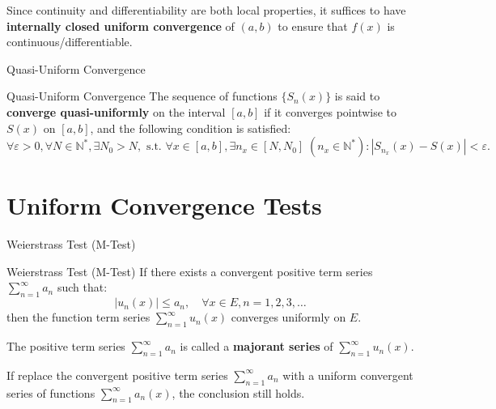 \documentclass[11pt]{../../TexTemplate/elegantbook}
\begin{document}
\begin{note}
    Since continuity and differentiability are both local properties, 
    it suffices to have \textbf{internally closed uniform convergence} of \( (a, b) \) 
    to ensure that \( f(x) \) is continuous/differentiable.
\end{note}


\begin{leftbarTitle}{Quasi-Uniform Convergence}\end{leftbarTitle}
\begin{definition}{Quasi-Uniform Convergence}
    The sequence of functions \( \{ S_n(x) \} \) is said to \textbf{converge quasi-uniformly}
    on the interval \( [a, b] \) 
    if it converges pointwise to \( S(x) \) on \( [a, b] \), and the following condition is satisfied:
    \[
    \forall \varepsilon > 0, \forall N \in \mathbb{N}^*, \exists N_0 > N,
    \text{ s.t. } \forall x \in [a, b], \exists n_x \in [N, N_0] \; 
    (n_x \in \mathbb{N}^*): |S_{n_x}(x) - S(x)| < \varepsilon.
    \]    
\end{definition}


\section{Uniform Convergence Tests}
\begin{leftbarTitle}{Weierstrass Test (M-Test)}\end{leftbarTitle}
\begin{theorem}{Weierstrass Test (M-Test)}
    If there exists a convergent positive term series \( \sum_{n=1}^{\infty} a_n \) such that:
    \[
    |u_n(x)| \leqslant a_n, \quad \forall x \in E, n = 1, 2, 3, \dots
    \]
    then the function term series \( \sum_{n=1}^{\infty} u_n(x) \) converges uniformly on \( E \).

    The positive term series \( \sum_{n=1}^{\infty} a_n \) 
    is called a \textbf{majorant series} of \( \sum_{n=1}^{\infty} u_n(x) \).

    If replace the convergent positive term series \( \sum_{n=1}^{\infty} a_n \)
    with a uniform convergent series of functions \( \sum_{n=1}^{\infty} a_n(x) \),
    the conclusion still holds. 
\end{theorem}
\end{document}
